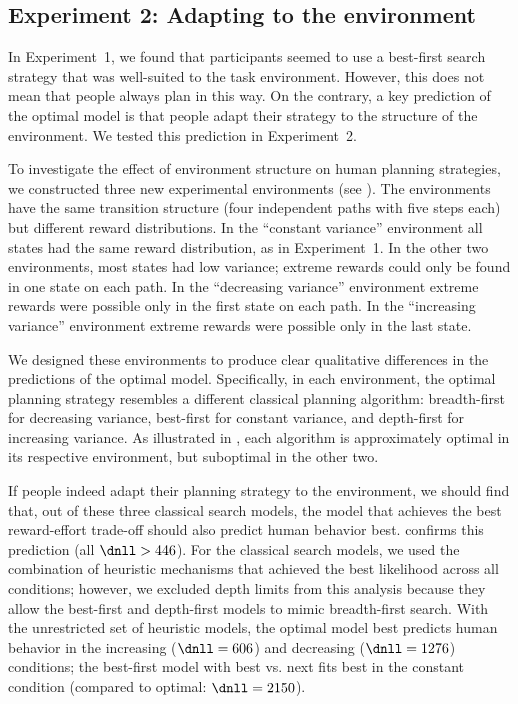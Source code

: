 \subsection{Experiment 2: Adapting to the environment}\label{sec:planning-results2}
In Experiment~1, we found that participants seemed to use a best-first search strategy that was well-suited to the task environment. However, this does not mean that people always plan in this way. 
On the contrary, a key prediction of the optimal model is that people adapt their strategy to the structure of the environment. We tested this prediction in Experiment~2.

To investigate the effect of environment structure on human planning strategies, we constructed three new experimental environments (see ). The environments have the same transition structure (four independent paths with five steps each) but different reward distributions. In the ``constant variance'' environment all states had the same reward distribution, as in Experiment~1. In the other two environments, most states had low variance; extreme rewards could only be found in one state on each path. In the ``decreasing variance'' environment extreme rewards were possible only in the first state on each path. In the ``increasing variance'' environment extreme rewards were possible only in the last state.

We designed these environments to produce clear qualitative differences in the predictions of the optimal model. Specifically, in each environment, the optimal planning strategy resembles a different classical planning algorithm: breadth-first for decreasing variance, best-first for constant variance, and depth-first for increasing variance. As illustrated in , each algorithm is approximately optimal in its respective environment, but suboptimal in the other two.

If people indeed adapt their planning strategy to the environment, we should find that, out of these three classical search models, the model that achieves the best reward-effort trade-off should also predict human behavior best.  confirms this prediction (all $\dnll > 446$). For the classical search models, we used the combination of heuristic mechanisms that achieved the best likelihood across all conditions; however, we excluded depth limits from this analysis because they allow the best-first and depth-first models to mimic breadth-first search. With the unrestricted set of heuristic models, the optimal model best predicts human behavior in the increasing ($\dnll = 606$) and decreasing ($\dnll = 1276$) conditions; the best-first model with best vs. next fits best in the constant condition (compared to optimal: $\dnll = 2150$).

